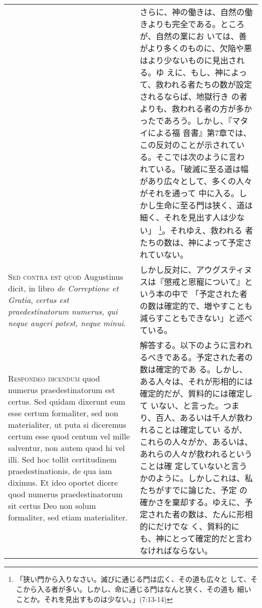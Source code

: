 \documentclass[10pt]{jsarticle} %
\begin{document}
\begin{longtable}{p{21em}p{21em}}
&

さらに、神の働きは、自然の働きよりも完全である。ところが、自然の業にお
いては、善がより多くのものに、欠陥や悪はより少ないものに見出される。ゆ
えに、もし、神によって、救われる者たちの数が設定されるならば、地獄行き
の者よりも、救われる者の方が多かったであろう。しかし、『マタイによる福
音書』第7章では、この反対のことが示されている。そこでは次のように言わ
れている。「破滅に至る道は幅があり広々として、多くの人々がそれを通って
中に入る。しかし生命に至る門は狭く、道は細く、それを見出す人は少ない」
\footnote{「狭い門から入りなさい。滅びに通じる門は広く、その道も広々と
して、そこから入る者が多い。しかし、命に通じる門はなんと狭く、その道も
細いことか。それを見出すものは少ない。」(7:13-14)}。それゆえ、救われる
者たちの数は、神によって予定されていない。




\\


{\scshape Sed contra est quod} Augustinus dicit, in
libro {\itshape de Correptione et Gratia}, {\itshape certus est praedestinatorum numerus, qui
neque augeri potest, neque minui}.


&

しかし反対に、アウグスティヌスは『懲戒と恩寵について』という本の中で
「予定された者の数は確定的で、増やすことも減らすこともできない」と述べ
ている。


\\


{\scshape Respondeo dicendum} quod numerus
praedestinatorum est certus. Sed quidam dixerunt eum esse certum
formaliter, sed non materialiter, ut puta si diceremus certum esse quod
centum vel mille salventur, non autem quod hi vel illi. Sed hoc tollit
certitudinem praedestinationis, de qua iam diximus. Et ideo oportet
dicere quod numerus praedestinatorum sit certus Deo non solum
formaliter, sed etiam materialiter. 


&


解答する。以下のように言われるべきである。予定された者の数は確定的であ
る。しかし、ある人々は、それが形相的には確定的だが、質料的には確定して
いない、と言った。つまり、百人、あるいは千人が救われることは確定してい
るが、これらの人々がか、あるいは、あれらの人々が救われるということは確
定していないと言うかのように。しかしこれは、私たちがすでに論じた、予定
の確かさを棄却する。ゆえに、予定された者の数は、たんに形相的にだけでな
く、質料的にも、神にとって確定的だと言わなければならない。


\\


\end{longtable}
\end{document}
